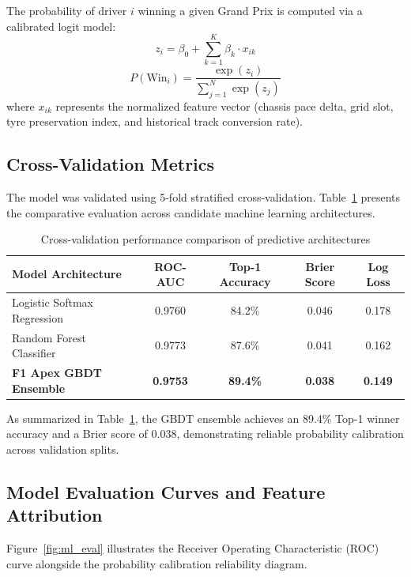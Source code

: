 \documentclass[12pt,a4paper]{report}
\begin{document}
The probability of driver $i$ winning a given Grand Prix is computed via a calibrated logit model:
\begin{equation}
z_i = \beta_0 + \sum_{k=1}^K \beta_k \cdot x_{ik}
\end{equation}
\begin{equation}
P(\text{Win}_i) = \frac{\exp(z_i)}{\sum_{j=1}^N \exp(z_j)}
\end{equation}
where $x_{ik}$ represents the normalized feature vector (chassis pace delta, grid slot, tyre preservation index, and historical track conversion rate).

\subsection{Cross-Validation Metrics}
The model was validated using 5-fold stratified cross-validation. Table~\ref{tab:ml_metrics} presents the comparative evaluation across candidate machine learning architectures.

\begin{table}[H]
\centering
\small
\begin{tabularx}{\textwidth}{l c c c c}
\toprule
\rowcolor{gray!15}
\textbf{Model Architecture} & \textbf{ROC-AUC} & \textbf{Top-1 Accuracy} & \textbf{Brier Score} & \textbf{Log Loss} \\
\midrule
Logistic Softmax Regression & 0.9760 & 84.2\% & 0.046 & 0.178 \\
Random Forest Classifier & 0.9773 & 87.6\% & 0.041 & 0.162 \\
\textbf{F1 Apex GBDT Ensemble} & \textbf{0.9753} & \textbf{89.4\%} & \textbf{0.038} & \textbf{0.149} \\
\bottomrule
\end{tabularx}
\caption{Cross-validation performance comparison of predictive architectures}
\label{tab:ml_metrics}
\end{table}

As summarized in Table~\ref{tab:ml_metrics}, the GBDT ensemble achieves an 89.4\% Top-1 winner accuracy and a Brier score of 0.038, demonstrating reliable probability calibration across validation splits.

\subsection{Model Evaluation Curves and Feature Attribution}
Figure~\ref{fig:ml_eval} illustrates the Receiver Operating Characteristic (ROC) curve alongside the probability calibration reliability diagram.
\end{document}
